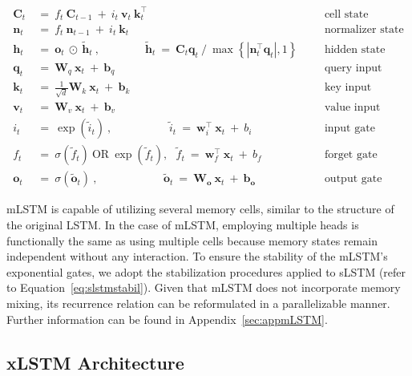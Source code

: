 \begin{align}
\label{eq:mlstm_recurrent_begin}
\mathbf{C}_t \ &= \  f_t \ \mathbf{C}_{t-1} \ + \ 
  i_t \ \mathbf{v}_t \ \mathbf{k}_t^\top & &  &\text{cell state} \\
\mathbf{n}_t \ &= \  f_t \ \mathbf{n}_{t-1} \ + \ 
  i_t \ \mathbf{k}_t & &  &\text{normalizer state} \\
\mathbf{h}_t  \ &= \ \mathbf{o}_t \ \odot \ \tilde{\mathbf{h}}_t
\ , \qquad \qquad 
\tilde{\mathbf{h}}_t \ = \   \mathbf{C}_t \mathbf{q}_t \ / \ 
  \max \left\{ |\mathbf{n}_t^\top \mathbf{q}_t|, 1 \right\} 
   &&&\text{hidden state} \\
\mathbf{q}_t \ &= \ \mathbf{W}_q \ \mathbf{x}_t \ + \ \mathbf{b}_q  & &  &\text{query input} \\
\mathbf{k}_t \ &= \ \frac{1}{\sqrt{d}} \mathbf{W}_k \ \mathbf{x}_t \ + \ \mathbf{b}_k  & &  &\text{key input} \\
\mathbf{v}_t \ &= \ \mathbf{W}_v \ \mathbf{x}_t \ + \ \mathbf{b}_v  & &  &\text{value input} \\
i_t \ &= \ \!\exp \!  \! \left( \tilde{i}_t  \right) \ , 
 \qquad \qquad \ \ \ \ \,
  \tilde{i}_t \ = \ \mathbf{w}^\top_{i} \ \mathbf{x}_t \ + \  b_{i} \ \ \ 
  &&&\text{input gate} \\
f_t \ &= \ \sigma \!  \left(  \tilde{f}_t \right) \ \text{OR} \ \!\exp \!  \! \left(  \tilde{f}_t \right) , \ \ \: \!
\tilde{f}_t \ = \ \mathbf{w}^\top_{f} \ \mathbf{x}_t  \ + \
  b_{f}
  &&& \text{forget gate} \\
\label{eq:mlstm_recurrent_end}
\mathbf{o}_t \ &= \ \sigma \left( \tilde{\mathbf{o}}_t \right) \ , \qquad \qquad \quad \ \ \ \,
  \tilde{\mathbf{o}}_t  \ = \ \mathbf{W}_{\mathbf{o}} \ \mathbf{x}_t \ + \
  \mathbf{b}_{\mathbf{o}}
  &&&\text{output gate} 
\end{align}

mLSTM is capable of utilizing several memory cells, similar to the structure of the original LSTM. In the case of mLSTM, employing multiple heads is functionally the same as using multiple cells because memory states remain independent without any interaction. To ensure the stability of the mLSTM’s exponential gates, we adopt the stabilization procedures applied to sLSTM (refer to Equation~\ref{eq:slstmstabil}). 
Given that mLSTM does not incorporate memory mixing, its recurrence relation can be reformulated in a parallelizable manner. Further information can be found in Appendix~\ref{sec:appmLSTM}.

\subsection{xLSTM Architecture}
\label{sec:xLSTMarch}

